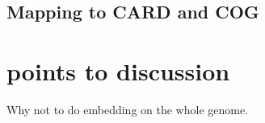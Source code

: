 \documentclass{bmcart}
\begin{document}
\subsection*{Mapping to CARD and COG}


\section*{points to discussion}
Why not to do embedding on the whole genome. 


\clearpage



\clearpage
\end{document}

